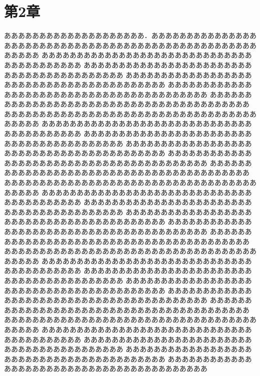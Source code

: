 \documentclass[a4paper,10pt,twocolumn]{jarticle}
\begin{document}
\section{第2章}
ああああああああああああああああああああ．あああああああああああああああ
あああああああああああああああああああああああああああああああああああああああああ
あああああああああああああああああああああああああああああああああああああああああ
あああああああああああああああああああああああああああああああああああああああああ
あああああああああああああああああああああああああああああああああああああああああ
あああああああああああああああああああああああああああああああああああああああああ
あああああああああああああああああああああああああああああああああああああああああ
あああああああああああああああああああああああああああああああああああああああああ
あああああああああああああああああああああああああああああああああああああああああ
あああああああああああああああああああああああああああああああああああああああああ
あああああああああああああああああああああああああああああああああああああああああ
あああああああああああああああああああああああああああああああああああああああああ
あああああああああああああああああああああああああああああああああああああああああ
あああああああああああああああああああああああああああああああああああああああああ
あああああああああああああああああああああああああああああああああああああああああ
あああああああああああああああああああああああああああああああああああああああああ
あああああああああああああああああああああああああああああああああああああああああ
あああああああああああああああああああああああああああああああああああああああああ
あああああああああああああああああああああああああああああああああああああああああ
あああああああああああああああああああああああああああああああああああああああああ
あああああああああああああああああああああああああああああああああああああああああ
あああああああああああああああああああああああああああああああああああああああああ
あああああああああああああああああああああああああああああああああああああああああ
あああああああああああああああああああああああああああああああああああああああああ
あああああああああああああああああああああああああああああああああああああああああ
あああああああああああああああああああああああああああああああああああああああああ
あああああああああああああああああああああああああああああああああああああああああ
あああああああああああああああああああああああああああああああああああああああああ
あああああああああああああああああああああああああああああああああああああああああ
あああああああああああああああああああああああああああああああああああああああああ
\end{document}
